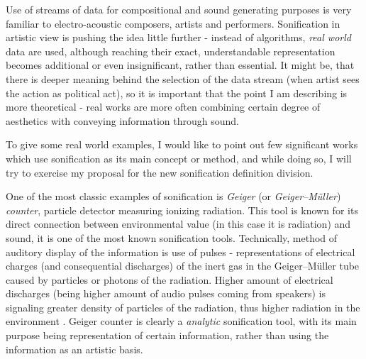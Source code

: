 \documentclass[12pt,a4paper,oneside]{report}
\begin{document}
Use of streams of data for compositional and sound generating purposes is very familiar to electro-acoustic composers, artists and performers. Sonification in artistic view is pushing the idea little further - instead of algorithms, \emph{real world} data are used, although reaching their exact, understandable representation becomes additional or even insignificant, rather than essential. It might be, that there is deeper meaning behind the selection of the data stream (when artist sees the action as political act), so it is important that the point I am describing is more theoretical - real works are more often combining certain degree of aesthetics with conveying information through sound.



To give some real world examples, I would like to point out few significant works which use sonification as its main concept or method, and while doing so, I will try to exercise my proposal for the new sonification definition division.

One of the most classic examples of sonification is \emph{Geiger} (or \emph{Geiger–Müller}) \emph{counter}, particle detector measuring ionizing radiation. This tool is known for its direct connection between environmental value (in this case it is radiation) and sound, it is one of the most known sonification tools. Technically, method of auditory display of the information is use of pulses - representations of electrical charges (and consequential discharges) of the inert gas in the Geiger–Müller tube caused by particles or photons of the radiation. Higher amount of electrical discharges (being higher amount of audio pulses coming from speakers) is signaling greater density of particles of the radiation, thus higher radiation in the environment \cite{Knoll2010}. Geiger counter is clearly a \emph{analytic} sonification tool, with its main purpose being representation of certain information, rather than using the information as an artistic basis.
\end{document}
